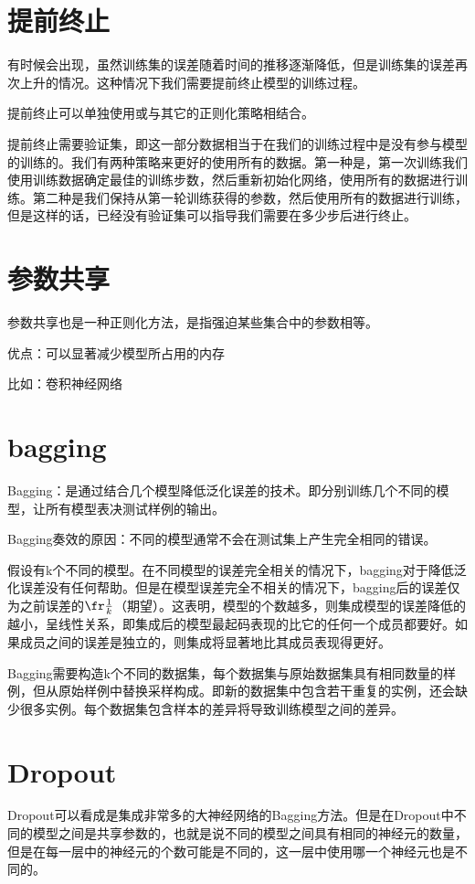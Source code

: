 \section{提前终止}
	有时候会出现，虽然训练集的误差随着时间的推移逐渐降低，但是训练集的误差再次上升的情况。这种情况下我们需要提前终止模型的训练过程。
	
	提前终止可以单独使用或与其它的正则化策略相结合。
	
	提前终止需要验证集，即这一部分数据相当于在我们的训练过程中是没有参与模型的训练的。我们有两种策略来更好的使用所有的数据。第一种是，第一次训练我们使用训练数据确定最佳的训练步数，然后重新初始化网络，使用所有的数据进行训练。第二种是我们保持从第一轮训练获得的参数，然后使用所有的数据进行训练，但是这样的话，已经没有验证集可以指导我们需要在多少步后进行终止。	
	
\section{参数共享}
	参数共享也是一种正则化方法，是指强迫某些集合中的参数相等。
	
	优点：可以显著减少模型所占用的内存
	
	比如：卷积神经网络
	
\section{bagging}
	Bagging：是通过结合几个模型降低泛化误差的技术。即分别训练几个不同的模型，让所有模型表决测试样例的输出。
	
	Bagging奏效的原因：不同的模型通常不会在测试集上产生完全相同的错误。
	
	假设有k个不同的模型。在不同模型的误差完全相关的情况下，bagging对于降低泛化误差没有任何帮助。但是在模型误差完全不相关的情况下，bagging后的误差仅为之前误差的$\fr\frac{1}{k}$（期望）。这表明，模型的个数越多，则集成模型的误差降低的越小，呈线性关系，即集成后的模型最起码表现的比它的任何一个成员都要好。如果成员之间的误差是独立的，则集成将显著地比其成员表现得更好。
	
	Bagging需要构造k个不同的数据集，每个数据集与原始数据集具有相同数量的样例，但从原始样例中替换采样构成。即新的数据集中包含若干重复的实例，还会缺少很多实例。每个数据集包含样本的差异将导致训练模型之间的差异。
	

\section{Dropout}
	Dropout可以看成是集成非常多的大神经网络的Bagging方法。但是在Dropout中不同的模型之间是共享参数的，也就是说不同的模型之间具有相同的神经元的数量，但是在每一层中的神经元的个数可能是不同的，这一层中使用哪一个神经元也是不同的。
	
